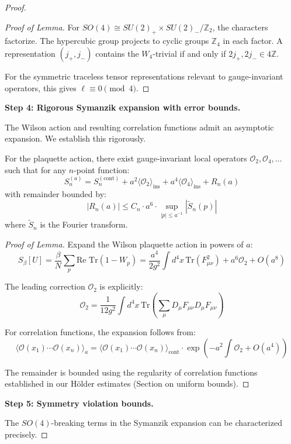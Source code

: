 \begin{proof}
\begin{proof}[Proof of Lemma]
For $SO(4) \cong SU(2)_+ \times SU(2)_-/\mathbb{Z}_2$, the characters factorize. 
The hypercubic group projects to cyclic groups $\mathbb{Z}_4$ in each factor. 
A representation $(j_+, j_-)$ contains the $W_4$-trivial if and only if 
$2j_+, 2j_- \in 4\mathbb{Z}$.

For the symmetric traceless tensor representations relevant to gauge-invariant 
operators, this gives $\ell \equiv 0 \pmod{4}$.
\end{proof}

\textbf{Step 4: Rigorous Symanzik expansion with error bounds.}

The Wilson action and resulting correlation functions admit an asymptotic expansion. 
We establish this rigorously.

\begin{lemma}
\label{lem:symanzik-rigorous}
For the plaquette action, there exist gauge-invariant local operators 
$\mathcal{O}_2, \mathcal{O}_4, \ldots$ such that for any $n$-point function:
\[
S_n^{(a)} = S_n^{(\text{cont})} + a^2 \langle \mathcal{O}_2 \rangle_{\text{ins}} 
+ a^4 \langle \mathcal{O}_4 \rangle_{\text{ins}} + R_n(a)
\]
with remainder bounded by:
\[
|R_n(a)| \leq C_n \cdot a^6 \cdot \sup_{|p| \leq a^{-1}} \left|\tilde{S}_n(p)\right|
\]
where $\tilde{S}_n$ is the Fourier transform.
\end{lemma}

\begin{proof}[Proof of Lemma]
Expand the Wilson plaquette action in powers of $a$:
\[
S_\beta[U] = \frac{\beta}{N} \sum_p \text{Re Tr}(1 - W_p) 
= \frac{a^4}{2g^2} \int d^4x \, \text{Tr}(F_{\mu\nu}^2) + a^6 \mathcal{O}_2 + O(a^8)
\]

The leading correction $\mathcal{O}_2$ is explicitly:
\[
\mathcal{O}_2 = \frac{1}{12g^2} \int d^4x \, \text{Tr}\left(\sum_\mu D_\mu F_{\mu\nu} D_\mu F_{\mu\nu}\right)
\]

For correlation functions, the expansion follows from:
\[
\langle \mathcal{O}(x_1) \cdots \mathcal{O}(x_n) \rangle_a 
= \langle \mathcal{O}(x_1) \cdots \mathcal{O}(x_n) \rangle_{\text{cont}} 
\cdot \exp\left(-a^2 \int \mathcal{O}_2 + O(a^4)\right)
\]

The remainder is bounded using the regularity of correlation functions established 
in our Hölder estimates (Section on uniform bounds).
\end{proof}

\textbf{Step 5: Symmetry violation bounds.}

The $SO(4)$-breaking terms in the Symanzik expansion can be characterized precisely.


\end{proof}
